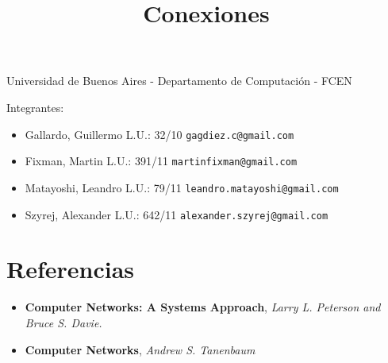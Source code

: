 \documentclass[a4paper,11pt]{article}
\title{Conexiones}
\begin{document}
\maketitle

\begin{center}
	Universidad de Buenos Aires - Departamento de Computaci\'on - FCEN
\end{center}

\vspace{2cm}
Integrantes:

\begin{itemize}
	\item Gallardo, Guillermo L.U.: 32/10 \verb+gagdiez.c@gmail.com+
	\item Fixman, Martin L.U.: 391/11 \verb+martinfixman@gmail.com+
	\item Matayoshi, Leandro L.U.: 79/11 \verb+leandro.matayoshi@gmail.com+
	\item Szyrej, Alexander L.U.: 642/11 \verb+alexander.szyrej@gmail.com+
		
\end{itemize}

\newpage

\tableofcontents

\newpage








%

%

\section{Referencias}
\begin{itemize}
	\item \textbf{Computer Networks: A Systems Approach}, \textit{Larry L. Peterson and Bruce S. Davie.}
	\item \textbf{Computer Networks}, \textit{Andrew S. Tanenbaum}
\end{itemize}
\end{document}
